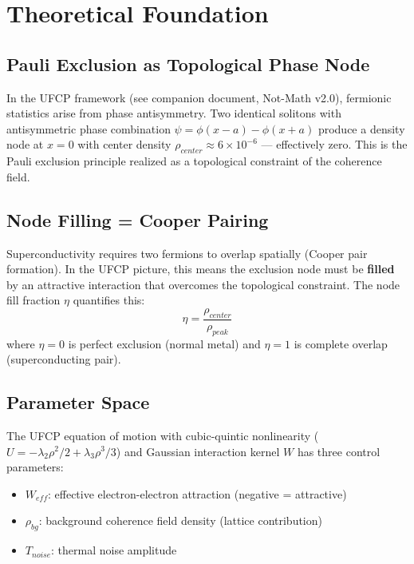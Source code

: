 \documentclass[11pt, a4paper]{article}
\begin{document}
\section{Theoretical Foundation}

\subsection{Pauli Exclusion as Topological Phase Node}

In the UFCP framework (see companion document, Not-Math v2.0),
fermionic statistics arise from phase antisymmetry. Two identical
solitons with antisymmetric phase combination
$\psi = \phi(x - a) - \phi(x + a)$ produce a density node at
$x = 0$ with center density $\rho_{center} \approx 6 \times 10^{-6}$
--- effectively zero. This is the Pauli exclusion principle realized
as a topological constraint of the coherence field.

\subsection{Node Filling = Cooper Pairing}

Superconductivity requires two fermions to overlap spatially
(Cooper pair formation). In the UFCP picture, this means the
exclusion node must be \textbf{filled} by an attractive interaction
that overcomes the topological constraint. The node fill fraction
$\eta$ quantifies this:
\begin{equation}
  \eta = \frac{\rho_{center}}{\rho_{peak}}
\end{equation}
where $\eta = 0$ is perfect exclusion (normal metal) and
$\eta = 1$ is complete overlap (superconducting pair).

\subsection{Parameter Space}

The UFCP equation of motion with cubic-quintic nonlinearity
($U = -\lambda_2 \rho^2/2 + \lambda_3 \rho^3/3$) and Gaussian
interaction kernel $W$ has three control parameters:
\begin{itemize}[nosep]
  \item $W_{eff}$: effective electron-electron attraction (negative
        = attractive)
  \item $\rho_{bg}$: background coherence field density (lattice
        contribution)
  \item $T_{noise}$: thermal noise amplitude
\end{itemize}
\end{document}
